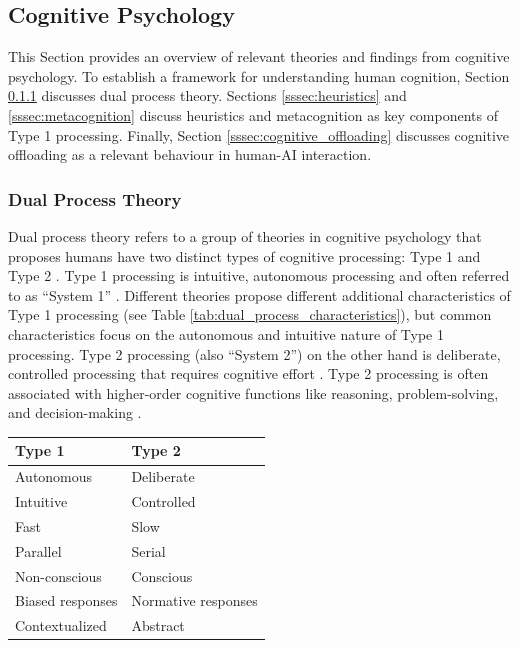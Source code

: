 \subsection{Cognitive Psychology} \label{ssec:cognitive_psychology}

This Section provides an overview of relevant theories and findings from cognitive psychology. To establish a framework for understanding human cognition, Section \ref{sssec:dual_process} discusses dual process theory. Sections \ref{sssec:heuristics} and \ref{sssec:metacognition} discuss heuristics and metacognition as key components of Type 1 processing. Finally, Section \ref{sssec:cognitive_offloading} discusses cognitive offloading as a relevant behaviour in human-AI interaction.

\subsubsection{Dual Process Theory} \label{sssec:dual_process}

Dual process theory refers to a group of theories in cognitive psychology that proposes humans have two distinct types of cognitive processing: Type 1 and Type 2 \parencite{Evans2013}. Type 1 processing is intuitive, autonomous processing and often referred to as “System 1” \parencite{Kahnemann2011}. Different theories propose different additional characteristics of Type 1 processing (see Table \ref{tab:dual_process_characteristics}), but common characteristics focus on the autonomous and intuitive nature of Type 1 processing. Type 2 processing (also “System 2”) on the other hand is deliberate, controlled processing that requires cognitive effort \parencite{Evans2013}. Type 2 processing is often associated with higher-order cognitive functions like reasoning, problem-solving, and decision-making \parencite{Kahnemann2011}.

\begin{ctable}
    \begin{tabularx}{0.5\textwidth}{l|l}
        \textbf{Type 1} & \textbf{Type 2} \\
        \hline
        Autonomous & Deliberate \\
        Intuitive & Controlled \\
        \hline
        Fast & Slow \\
        Parallel & Serial \\
        Non-conscious & Conscious \\
        Biased responses & Normative responses \\
        Contextualized & Abstract \\
    \end{tabularx}
    \caption[Type 1 and Type 2 Characteristics]{Common characteristics of Type 1 and Type 2 processing in dual process theories \parencite{Evans2013}}
    \label{tab:dual_process_characteristics}
\end{ctable}

